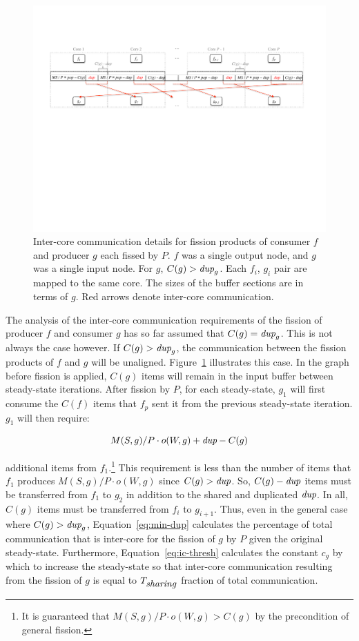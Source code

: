 \begin{figure}[t]
\centering
\includegraphics[width=\textwidth]{figures/remaining-dup-case.pdf}
\caption[Extra inter-core communication when $C(g) > \mt{dup}_g$.]
{  Inter-core communication details for fission products of consumer $f$
  and producer $g$ each fissed by $P$.  $f$ was a single output node,
  and $g$ was a single input node.  For $g$, $C(g) > \mt{dup}_g$.
  Each $f_i$, $g_i$ pair are mapped to the same core.
  The sizes of the buffer sections are in terms of $g$. Red arrows
  denote inter-core communication.\label{fig:remaining-dup}}
\end{figure}


The analysis of the inter-core communication requirements of the
fission of producer $f$ and consumer $g$ has so far assumed that $C(g)
= \mbox{\it dup}_g $.  This is not always the case however.  If $C(g) >
\mt{dup}_g$, the communication between the fission products of $f$ and
$g$ will be unaligned.  Figure~\ref{fig:remaining-dup} illustrates
this case.  In the graph before fission is applied, $C(g)$ items will
remain in the input buffer between steady-state iterations.  After
fission by $P$, for each steady-state, $g_1$ will first consume the
$C(f)$ items that $f_p$ sent it from the previous steady-state
iteration.  $g_1$ will then require:

\[ M(S, g)/P \cdot o(W, g) + \mbox{\it dup} - C(g)\]

\noindent additional items from $f_1$.\footnote{It is guaranteed that
  $M(S, g)/P \cdot o(W, g) > C(g)$ by the precondition of general
  fission.} This requirement is less than the number of items that
$f_1$ produces $M(S, g)/P \cdot o(W, g)$ since $C(g) > \mbox{\it dup}$. So,
$C(g) - \mbox{\it dup}$ items must be transferred from $f_1$ to $g_2$ in
addition to the shared and duplicated $\mbox{\it dup}$. In all, $C(g)$ items
must be transferred from $f_i$ to $g_{i+1}$. Thus, even in the general
case where $C(g) > \mt{dup}_g$, Equation~\ref{eq:min-dup} calculates
the percentage of total communication that is inter-core for the
fission of $g$ by $P$ given the original steady-state. Furthermore,
Equation~\ref{eq:ic-thresh} calculates the constant $c_g$ by which to
increase the steady-state so that inter-core communication resulting
from the fission of $g$ is equal to $T_{\mbox{\it sharing}}$ fraction of
total communication.

